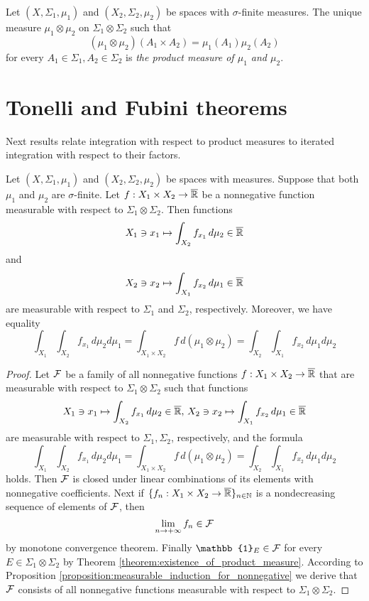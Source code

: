 \begin{definition}
    Let $(X,\Sigma_1,\mu_1)$ and $(X_2,\Sigma_2,\mu_2)$ be spaces with $\sigma$-finite measures. The unique measure $\mu_1\otimes \mu_2$ on $\Sigma_1\otimes \Sigma_2$ such that
    $$\left(\mu_1\otimes \mu_2\right)\left(A_1\times A_2\right) = \mu_1(A_1)\mu_2(A_2)$$
    for every $A_1\in \Sigma_1, A_2\in \Sigma_2$ is \textit{the product measure of $\mu_1$ and $\mu_2$}.
\end{definition}

\section{Tonelli and Fubini theorems}
\noindent
Next results relate integration with respect to product measures to iterated integration with respect to their factors.

\begin{theorem}[Tonelli]\label{theorem:Tonelli}
    Let $(X,\Sigma_1,\mu_1)$ and $(X_2,\Sigma_2,\mu_2)$ be spaces with measures. Suppose that both $\mu_1$ and $\mu_2$ are $\sigma$-finite. Let $f:X_1\times X_2\rightarrow \overline{{\mathbb R}}$ be a nonnegative function measurable with respect to $\Sigma_1\otimes \Sigma_2$. Then functions
    $$X_1\ni x_1 \mapsto \int_{X_2}f_{x_1}\,d\mu_2\in \overline{{\mathbb R}}$$
    and
    $$X_2\ni x_2 \mapsto \int_{X_1}f_{x_2}\,d\mu_1\in \overline{{\mathbb R}}$$
    are measurable with respect to $\Sigma_1$ and $\Sigma_2$, respectively. Moreover, we have equality
    $$\int_{X_1}\int_{X_2}f_{x_1}\,d\mu_2d\mu_1 = \int_{X_1\times X_2}f\,d(\mu_1\otimes \mu_2) = \int_{X_2}\int_{X_1}f_{x_2}\,d\mu_1d\mu_2$$
\end{theorem}
\begin{proof}
    Let ${\mathcal F}$ be a family of all nonnegative functions $f:X_1\times X_2\rightarrow \overline{{\mathbb R}}$ that are measurable with respect to $\Sigma_1\otimes \Sigma_2$ such that functions
    $$X_1\ni x_1\mapsto \int_{X_2}f_{x_1}\,d\mu_2\in \overline{{\mathbb R}},\,X_2\ni x_2\mapsto \int_{X_1}f_{x_2}\,d\mu_1\in \overline{{\mathbb R}}$$
    are measurable with respect to $\Sigma_1, \Sigma_2$, respectively, and the formula
    $$\int_{X_1}\int_{X_2}f_{x_1}\,d\mu_2d\mu_1 = \int_{X_1\times X_2}f\,d(\mu_1\otimes \mu_2) = \int_{X_2}\int_{X_1}f_{x_2}\,d\mu_1d\mu_2$$
    holds. Then ${\mathcal F}$ is closed under linear combinations of its elements with nonnegative coefficients. Next if $\{f_n:X_1\times X_2\rightarrow \overline{{\mathbb R}}\}_{n\in {\mathbb N}}$ is a nondecreasing sequence of elements of ${\mathcal F}$, then
    $$\lim_{n\rightarrow +\infty}f_n\in {\mathcal F}$$
    by monotone convergence theorem. Finally $\mathbb{1}_E\in \cF$ for every $E\in \Sigma_1\otimes \Sigma_2$ by Theorem \ref{theorem:existence_of_product_measure}. According to Proposition \ref{proposition:measurable_induction_for_nonnegative} we derive that ${\mathcal F}$ consists of all nonnegative functions measurable with respect to $\Sigma_1\otimes \Sigma_2$.
\end{proof}

